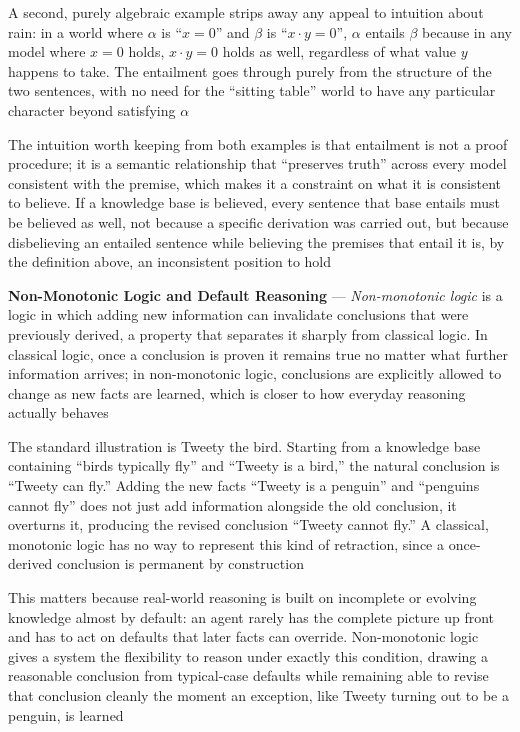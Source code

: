 A second, purely algebraic example strips away any appeal to intuition
about rain: in a world where $\alpha$ is ``$x = 0$'' and $\beta$ is
``$x \cdot y = 0$'', $\alpha$ entails $\beta$ because in any model where
$x = 0$ holds, $x \cdot y = 0$ holds as well, regardless of what value $y$
happens to take. The entailment goes through purely from the structure of
the two sentences, with no need for the ``sitting table'' world to have any
particular character beyond satisfying $\alpha$

The intuition worth keeping from both examples is that entailment is not a
proof procedure; it is a semantic relationship that ``preserves truth''
across every model consistent with the premise, which makes it a
constraint on what it is consistent to believe. If a knowledge base is
believed, every sentence that base entails must be believed as well, not
because a specific derivation was carried out, but because disbelieving an
entailed sentence while believing the premises that entail it is, by the
definition above, an inconsistent position to hold

\textbf{Non-Monotonic Logic and Default Reasoning} --- \emph{Non-monotonic
logic} is a logic in which adding new information can invalidate
conclusions that were previously derived, a property that separates it
sharply from classical logic. In classical logic, once a conclusion is
proven it remains true no matter what further information arrives; in
non-monotonic logic, conclusions are explicitly allowed to change as new
facts are learned, which is closer to how everyday reasoning actually
behaves

The standard illustration is Tweety the bird. Starting from a knowledge
base containing ``birds typically fly'' and ``Tweety is a bird,'' the
natural conclusion is ``Tweety can fly.'' Adding the new facts ``Tweety is
a penguin'' and ``penguins cannot fly'' does not just add information
alongside the old conclusion, it overturns it, producing the revised
conclusion ``Tweety cannot fly.'' A classical, monotonic logic has no way
to represent this kind of retraction, since a once-derived conclusion is
permanent by construction

This matters because real-world reasoning is built on incomplete or
evolving knowledge almost by default: an agent rarely has the complete
picture up front and has to act on defaults that later facts can override.
Non-monotonic logic gives a system the flexibility to reason under exactly
this condition, drawing a reasonable conclusion from typical-case defaults
while remaining able to revise that conclusion cleanly the moment an
exception, like Tweety turning out to be a penguin, is learned

